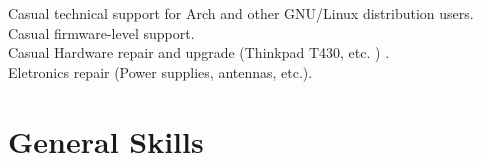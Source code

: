 \documentclass[singlesided,
               paper=a4,
               fontsize=9.3pt
              ]{my-resume}
\begin{document}
{    \vspace{0.3em}
    Casual technical support for Arch and other GNU/Linux distribution users.\\
    Casual firmware-level support.\\
    Casual Hardware repair and upgrade (Thinkpad T430, etc. ) .\\
    Eletronics repair (Power supplies, antennas, etc.).
    
    \vspace{0.4em}
    
    
    
    \section{General Skills}
    \smallskip %
 
    

}
\end{document}
